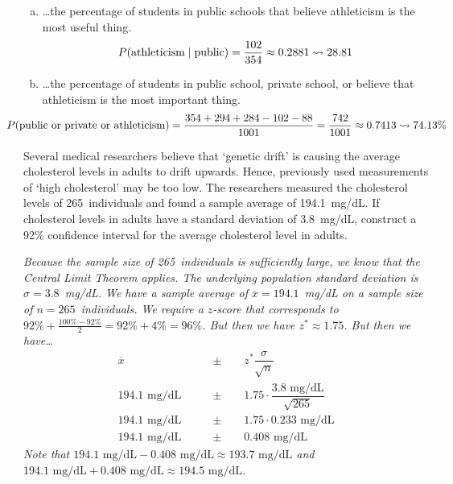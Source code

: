 \documentclass[12pt,letterpaper]{exam}
\begin{document}
\begin{questions}
\begin{enumerate}[(a)]
\item \dots the percentage of students in public schools that believe athleticism is the most useful thing. \pvspace{0.3cm}
	\[
	P(\text{athleticism} \;|\; \text{public})= \dfrac{102}{354} \approx 0.2881 \rightsquigarrow 28.81
	\] \pvspace{0.3cm}

\item \dots the percentage of students in public school, private school, or believe that athleticism is the most important thing. \pvspace{0.3cm}
	\[
	\hspace{-1.2cm} P(\text{public or private or athleticism})= \dfrac{354 + 294 + 284 - 102 - 88}{1001}= \dfrac{742}{1001} \approx 0.7413 \squiggle 74.13\%
	\]
\end{enumerate}



\newpage
\question[10] Several medical researchers believe that `genetic drift' is causing the average cholesterol levels in adults to drift upwards. Hence, previously used measurements of `high cholesterol' may be too low. The researchers measured the cholesterol levels of 265~individuals and found a sample average of 194.1~mg/dL. If cholesterol levels in adults have a standard deviation of 3.8~mg/dL, construct a 92\% confidence interval for the average cholesterol level in adults. \pvspace{1.5cm}

{\itshape Because the sample size of 265~individuals is sufficiently large, we know that the Central Limit Theorem applies. The underlying population standard deviation is $\sigma= 3.8$~mg/dL. We have a sample average of $\overline{x}= 194.1$~mg/dL on a sample size of $n= 265$~individuals. We require a $z$-score that corresponds to $92\% + \frac{100\% - 92\%}{2}= 92\% + 4\%= 96\%$. But then we have $z^* \approx 1.75$. But then we have\dots
	\[
	\begin{aligned}
	\overline{x} \qquad&\pm\qquad z^* \dfrac{\sigma}{\sqrt{n}} \\[0.3cm]
	194.1 \text{ mg/dL} \qquad&\pm\qquad 1.75 \cdot \dfrac{3.8 \text{ mg/dL}}{\sqrt{265}} \\[0.3cm]
	194.1 \text{ mg/dL} \qquad&\pm\qquad 1.75 \cdot 0.233 \text{ mg/dL} \\[0.3cm]
	194.1 \text{ mg/dL} \qquad&\pm\qquad 0.408 \text{ mg/dL} 
	\end{aligned}
	\] \pspace
Note that $194.1 \text{ mg/dL} - 0.408 \text{ mg/dL} \approx 193.7 \text{ mg/dL}$ and $194.1 \text{ mg/dL} + 0.408 \text{ mg/dL} \approx 194.5 \text{ mg/dL}$. \pspace

}
\end{questions}
\end{document}
